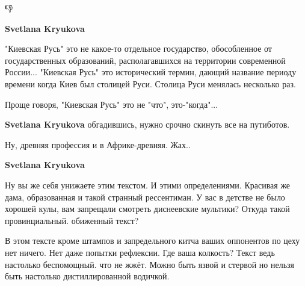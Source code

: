 \begin{itemize}
\begin{itemize}
👎

 
\textbf{Svetlana Kryukova} 

"Киевская Русь" это не какое-то отдельное государство, обособленное от
государственных образований, располагавшихся на территории современной
России... "Киевская Русь" это исторический термин, дающий название периоду
времени когда Киев был столицей Руси. Столица Руси менялась несколько раз.

Проще говоря, "Киевская Русь" это не "что", это-"когда"...

 
\textbf{Svetlana Kryukova} обгадившись, нужно срочно скинуть все на путиботов.

 
Ну, древняя профессия и в Африке-древняя. Жах..

 
\textbf{Svetlana Kryukova} 

Ну вы же себя унижаете этим текстом. И этими определениями. Красивая же дама,
образованная и такой странный рессентиман. У вас в детстве не было хорошей
кулы, вам запрещали смотреть диснеевские мультики? Откуда такой провинциальный.
обиженный текст? 

В этом тексте кроме штампов и запредельного китча ваших оппонентов по цеху нет
ничего. Нет даже попытки рефлексии. Где ваша колкость? Текст ведь настолько
беспомощный. что не жжёт. Можно быть язвой и стервой но нельзя быть настолько
дистиллированной водичкой.

 

\end{itemize}
\end{itemize}
